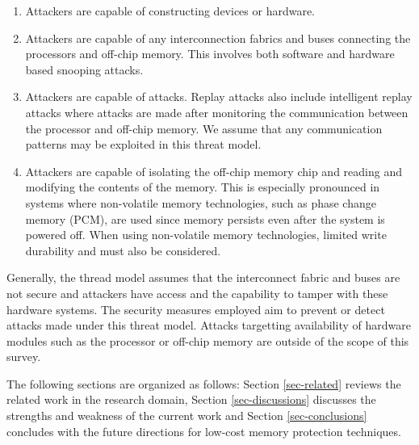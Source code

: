 \begin{enumerate}[noitemsep, topsep=0pt]
  \item Attackers are capable of constructing  devices or hardware.
  \item Attackers are capable of  any interconnection fabrics and
    buses connecting the processors and off-chip memory. This involves both
    software and hardware based snooping attacks.
  \item Attackers are capable of  attacks. Replay attacks also
    include intelligent replay attacks where attacks are made after monitoring
    the communication between the processor and off-chip memory. We assume that
    any communication patterns may be exploited in this threat model.
  \item Attackers are capable of isolating the off-chip memory chip and reading
    and modifying the contents of the memory. This is especially pronounced in
    systems where non-volatile memory technologies, such as phase change memory
    (PCM), are used since memory persists even after the system is powered off.
    When using non-volatile memory technologies, limited write durability and
    must also be considered.
\end{enumerate}

Generally, the thread model assumes that the interconnect fabric and buses are
not secure and attackers have access and the capability to tamper with these
hardware systems. The security measures employed aim to prevent or detect
attacks made under this threat model. Attacks targetting availability of
hardware modules such as the processor or off-chip memory are outside of the
scope of this survey.

The following sections are organized as follows: Section
\ref{sec-related} reviews the related work in the research domain, Section
\ref{sec-discussions} discusses the strengths and weakness of the current work
and Section \ref{sec-conclusions} concludes with the future directions for
low-cost memory protection techniques.
